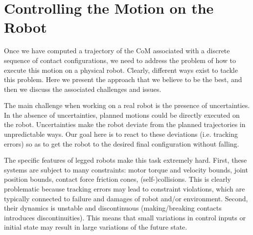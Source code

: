 
\section{Controlling the Motion on the Robot}
Once we have computed a trajectory of the CoM associated with a discrete sequence of contact configurations, we need to address the problem of how to execute this motion on a physical robot.
Clearly, different ways exist to tackle this problem.
Here we present the approach that we believe to be the best, and then we discuss the associated challenges and issues.

The main challenge when working on a real robot is the presence of uncertainties.
In the absence of uncertainties, planned motions could be directly executed on the robot.
Uncertainties make the robot deviate from the planned trajectories in unpredictable ways.
Our goal here is to react to these deviations (i.e. tracking errors) so as to get the robot to the desired final configuration without falling.

The specific features of legged robots make this task extremely hard.
First, these systems are subject to many constraints: motor torque and velocity bounds, joint position bounds, contact force friction cones, (self-)collisions.
This is clearly problematic because tracking errors may lead to constraint violations, which are typically connected to failure and damages of robot and/or environment.
Second, their dynamics is unstable and discontinuous (making/breaking contacts introduces discontinuities).
This means that small variations in control inputs or initial state may result in large variations of the future state.

